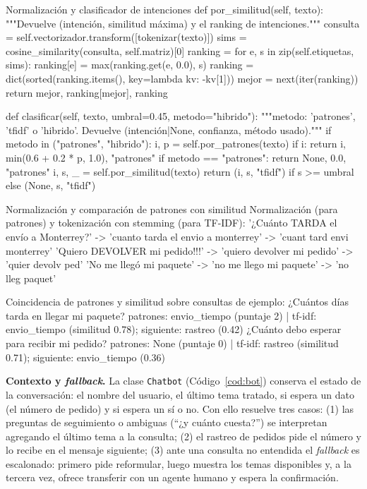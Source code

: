 \documentclass[11pt,letterpaper]{article}
\begin{document}
\begin{codigo}[label=cod:modelo]{Normalización y clasificador de intenciones}
    def por_similitud(self, texto):
        """Devuelve (intención, similitud máxima) y el ranking de intenciones."""
        consulta = self.vectorizador.transform([tokenizar(texto)])
        sims = cosine_similarity(consulta, self.matriz)[0]
        ranking = {}
        for e, s in zip(self.etiquetas, sims):
            ranking[e] = max(ranking.get(e, 0.0), s)
        ranking = dict(sorted(ranking.items(), key=lambda kv: -kv[1]))
        mejor = next(iter(ranking))
        return mejor, ranking[mejor], ranking

    def clasificar(self, texto, umbral=0.45, metodo="hibrido"):
        """metodo: 'patrones', 'tfidf' o 'hibrido'. Devuelve (intención|None, confianza, método usado)."""
        if metodo in ("patrones", "hibrido"):
            i, p = self.por_patrones(texto)
            if i:
                return i, min(0.6 + 0.2 * p, 1.0), "patrones"
            if metodo == "patrones":
                return None, 0.0, "patrones"
        i, s, _ = self.por_similitud(texto)
        return (i, s, "tfidf") if s >= umbral else (None, s, "tfidf")
\end{codigo}

\begin{consola}[label=out:norm]{Normalización y comparación de patrones con similitud}
Normalización (para patrones) y tokenización con stemming (para TF-IDF):
  '¿Cuánto TARDA el envío a Monterrey?'
    -> 'cuanto tarda el envio a monterrey'
    -> 'cuant tard envi monterrey'
  'Quiero DEVOLVER mi pedido!!!'
    -> 'quiero devolver mi pedido'
    -> 'quier devolv ped'
  'No me llegó mi paquete'
    -> 'no me llego mi paquete'
    -> 'no lleg paquet'

Coincidencia de patrones y similitud sobre consultas de ejemplo:
  ¿Cuántos días tarda en llegar mi paquete?
    patrones: envio_tiempo (puntaje 2) | tf-idf: envio_tiempo (similitud 0.78); siguiente: rastreo (0.42)
  ¿Cuánto debo esperar para recibir mi pedido?
    patrones: None (puntaje 0) | tf-idf: rastreo (similitud 0.71); siguiente: envio_tiempo (0.36)
\end{consola}

\textbf{Contexto y \textit{fallback}.} La clase \texttt{Chatbot} (Código~\ref{cod:bot}) conserva el estado de la conversación: el nombre del usuario, el último tema tratado, si espera un dato (el número de pedido) y si espera un sí o no. Con ello resuelve tres casos: (1) las preguntas de seguimiento o ambiguas (``¿y cuánto cuesta?'') se interpretan agregando el último tema a la consulta; (2) el rastreo de pedidos pide el número y lo recibe en el mensaje siguiente; (3) ante una consulta no entendida el \textit{fallback} es escalonado: primero pide reformular, luego muestra los temas disponibles y, a la tercera vez, ofrece transferir con un agente humano y espera la confirmación.
\end{document}
